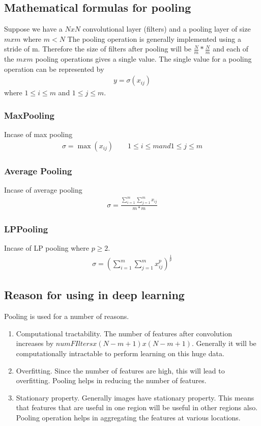 \documentclass{article}
\begin{document}
\subsection{Mathematical formulas for pooling}
Suppose we have a $N x N$ convolutional layer (filters) and a pooling layer of size $m x m$ where $ m < N $
The pooling operation is generally implemented using a stride of m.
Therefore the size of filters after pooling will be $\frac{N}{m} * \frac{N}{m} $ and each of the $m x m$ pooling operations gives a single value.
The single value for a pooling operation can be represented by
\begin{align*}
  y = \sigma(x_{ij})
\end{align*}
where $1 \le i \le m $ and $1 \le j \le m $.
\subsubsection{MaxPooling}
Incase of max pooling
\begin{align*}
  \sigma = \max(x_{ij}) \qquad 1 \le i \le m and 1 \le j \le m
\end{align*}

\subsubsection{Average Pooling}
Incase of average pooling
\begin{align*}
  \sigma = \frac{\sum_{i=1}^{m} \sum_{j=1}^{m} x_{ij}}{m*m}
\end{align*}

\subsubsection{LPPooling}
Incase of LP pooling where $p \ge 2$.
\begin{align*}
  \sigma = {(\sum_{i=1}^{m}\sum_{j=1}^{m} x_{ij}^{p} )}^{\frac{1}{p}}
\end{align*}

\subsection{Reason for using in deep learning}
Pooling is used for a number of reasons.
\begin{enumerate}
  \item Computational tractability.  The number of features after convolution increases by $numFIlters x (N-m+1) x (N-m+1)$.  Generally it will be computationally intractable to perform learning on this huge data.
  \item Overfitting.  Since the number of features are high, this will lead to overfitting.  Pooling helps in reducing the number of features.
  \item Stationary property.  Generally images have stationary property.  This means that features that are useful in one region will be useful in other regions also.  Pooling operation helps in aggregating the features at various locations.
\end{enumerate}
\end{document}
